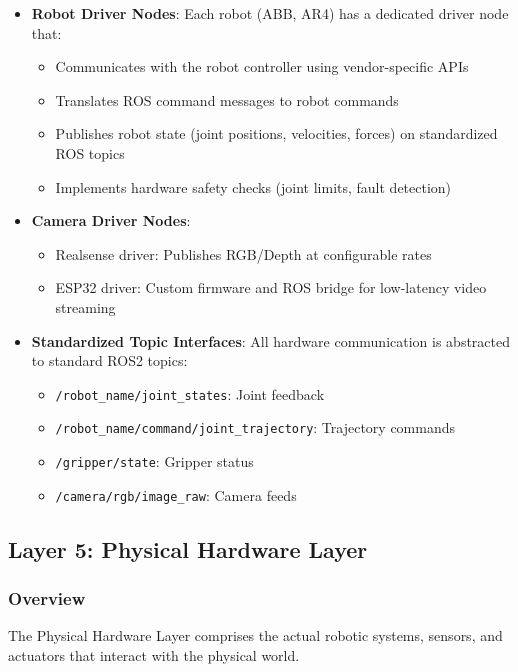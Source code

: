 \begin{itemize}
    \item \textbf{Robot Driver Nodes}: Each robot (ABB, AR4) has a dedicated driver node that:
    \begin{itemize}
        \item Communicates with the robot controller using vendor-specific APIs
        \item Translates ROS command messages to robot commands
        \item Publishes robot state (joint positions, velocities, forces) on standardized ROS topics
        \item Implements hardware safety checks (joint limits, fault detection)
    \end{itemize}
    
    \item \textbf{Camera Driver Nodes}: 
    \begin{itemize}
        \item Realsense driver: Publishes RGB/Depth at configurable rates
        \item ESP32 driver: Custom firmware and ROS bridge for low-latency video streaming
    \end{itemize}
    
    \item \textbf{Standardized Topic Interfaces}: All hardware communication is abstracted to standard ROS2 topics:
    \begin{itemize}
        \item \texttt{/robot\_name/joint\_states}: Joint feedback
        \item \texttt{/robot\_name/command/joint\_trajectory}: Trajectory commands
        \item \texttt{/gripper/state}: Gripper status
        \item \texttt{/camera/rgb/image\_raw}: Camera feeds
    \end{itemize}
\end{itemize}

\subsection{Layer 5: Physical Hardware Layer}
\label{subsec:physical_hardware_layer}

\subsubsection{Overview}
The Physical Hardware Layer comprises the actual robotic systems, sensors, and actuators that interact with the physical world.

